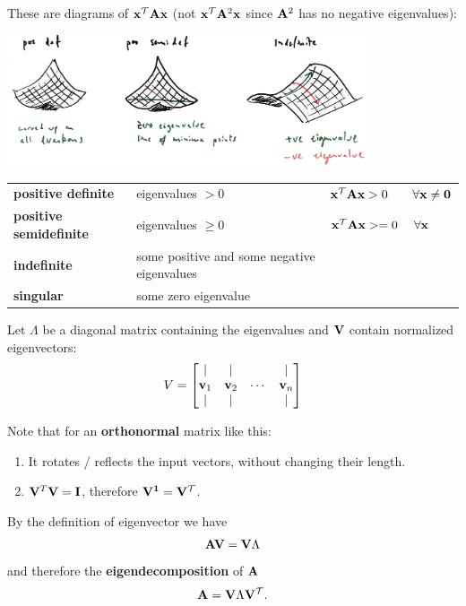 \begin{minipage}{\textwidth}
These are diagrams of $\mathbf x^\mathcal T\mathbf A\mathbf x$ (not $\mathbf x^\mathcal T\mathbf A^2\mathbf x$ since $\mathbf A^2$ has no negative eigenvalues):

\includegraphics[width=300pt]{img/machine-learning-quadratic-form-eigenvectors-2.png}

\begin{tabular}{ l | l | l }
  \textbf{positive definite}     & eigenvalues $> 0$    & $\mathbf x^\mathcal T\mathbf A\mathbf x > 0 ~~~~~~ \forall \mathbf x \neq \mathbf 0$ \\
  \textbf{positive semidefinite} & eigenvalues $\geq 0$ & $\mathbf x^\mathcal T\mathbf A\mathbf x >= 0 ~~~~ \forall \mathbf x$ \\
  \textbf{indefinite}            & some positive and some negative eigenvalues & \\
  \textbf{singular}              & some zero eigenvalue \\
\end{tabular}
\end{minipage}

Let $\Lambda$ be a diagonal matrix containing the eigenvalues and $\mathbf V$ contain
normalized eigenvectors:
\begin{align*}
V = \begin{bmatrix}
\mid & \mid & & \mid \\
\mathbf v_1 & \mathbf v_2 & \cdots & \mathbf v_n\\
\mid & \mid & & \mid \\
\end{bmatrix}
\end{align*}

Note that for an \textbf{orthonormal} matrix like this:
\begin{enumerate}
\item It rotates / reflects the input vectors, without changing their length.
\item  $\mathbf V^T\mathbf V = \mathbf I$, therefore $\mathbf V^{\mathbf 1} = \mathbf V^\mathcal T$.
\end{enumerate}


By the definition of eigenvector we have
\begin{align*}
  \mathbf A\mathbf V = \mathbf V\Lambda
\end{align*}
and therefore the \textbf{eigendecomposition} of $\mathbf A$
\begin{align*}
  \mathbf A = \mathbf V\Lambda\mathbf V^\mathcal T.
\end{align*}

